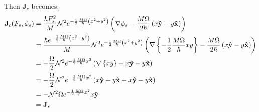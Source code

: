 \documentclass{article}
\begin{document}
Then $\mathbf{J}_c$ becomes:
\begin{align}
    \mathbf{J}_c(F_s, \phi_s)
    &= \frac{\hbar F_s^2}{M} \mathcal{N}^2 e^{- \frac{1}{2} \frac{M \Omega}{\hbar} \left( x^2 + y^2
       \right)} \left( \nabla \phi_s - \frac{M \Omega}{2 \hbar} \left( x\mathbf{ \hat{ y }} -
       y\mathbf{ \hat{ x }} \right) \right) \\
    &= \frac{\hbar e^{- \frac{1}{2} \frac{M \Omega}{\hbar} \left( x^2 - y^2
       \right)}}{M} \mathcal{N}^2 e^{- \frac{1}{2} \frac{M \Omega}{\hbar} \left( x^2
       + y^2 \right)} \left( \nabla \left\{ - \frac{1}{2} \frac{M \Omega}{\hbar} xy
       \right\} - \frac{M \Omega}{2 \hbar} \left( x\mathbf{ \hat{ y }} - y \mathbf{ \hat{ x }}
       \right) \right) \\
    &= -\frac{\Omega}{2} \mathcal{N}^2 e^{- \frac{1}{2} \frac{M
       \Omega}{\hbar} x^2} \left( \nabla \left\{ xy \right\} + x\mathbf{ \hat{ y }} -
       y\mathbf{ \hat{ x }} \right) \\
    &= -\frac{\Omega}{2} \mathcal{N}^2 e^{- \frac{1}{2} \frac{M
       \Omega}{\hbar} x^2} \left( x\mathbf{ \hat{ y }} + y\mathbf{ \hat{ x }} + x\mathbf{ \hat{ y }} -
       y\mathbf{ \hat{ x }} \right) \\
    &= -\mathcal{N}^2 \Omega e^{- \frac{1}{2} \frac{M \Omega}{\hbar} x^2}
       x\mathbf{ \hat{ y }} \\
       &= \mathbf{J}_s
\end{align}
\end{document}
